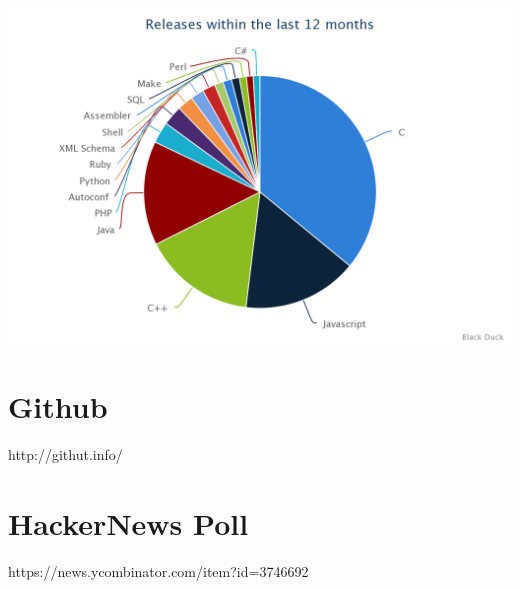 \includegraphics[width=\linewidth]{../../../data/js-trends/black-duck-15}


\section{Github}

http://githut.info/



\section{HackerNews Poll}

https://news.ycombinator.com/item?id=3746692

